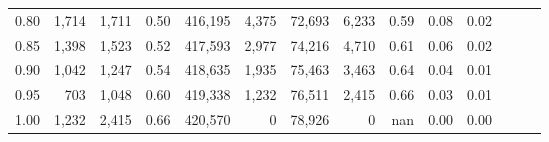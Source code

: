 \begin{tabular}{rrrrrrrrrrrrrr}
0.80 &   1,714 &  1,711 &  0.50 &  416,195 &    4,375 &  72,693 &   6,233 &  0.59 &  0.08 &      0.02 \\
0.85 &   1,398 &  1,523 &  0.52 &  417,593 &    2,977 &  74,216 &   4,710 &  0.61 &  0.06 &      0.02 \\
0.90 &   1,042 &  1,247 &  0.54 &  418,635 &    1,935 &  75,463 &   3,463 &  0.64 &  0.04 &      0.01 \\
0.95 &     703 &  1,048 &  0.60 &  419,338 &    1,232 &  76,511 &   2,415 &  0.66 &  0.03 &      0.01 \\
1.00 &   1,232 &  2,415 &  0.66 &  420,570 &        0 &  78,926 &       0 &   nan &  0.00 &      0.00 \\
\bottomrule
\end{tabular}
